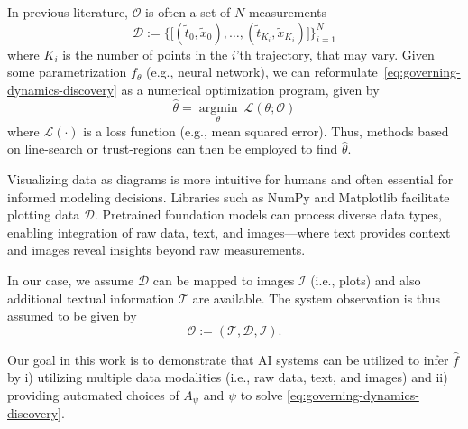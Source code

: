 \documentclass{article}
\begin{document}
In previous literature, $\mathcal{O}$ is often a set of $N$ measurements
\begin{equation}\label{eq:system-observation-raw-measurements}
\mathcal{D} := \Big\{\big[(\widetilde{t}_0, \widetilde{x}_0), \dots, (\widetilde{t}_{K_i}, \widetilde{x}_{K_i})\big]\Big\}_{i=1}^N
\end{equation}
where 
$K_i$ is the number of points in the $i$'th trajectory, that may vary. 
Given some parametrization $f_\theta$ (e.g., neural network), we can reformulate~\eqref{eq:governing-dynamics-discovery} as a numerical optimization program, given by
\begin{equation}
    \label{eq:governing-dynamics-discovery-regression}
    \widehat{\theta} = \underset{\theta}{\text{arg}\min}~\mathcal{L}(\theta; \mathcal{O})
\end{equation}
where $\mathcal{L}(\cdot)$ is a loss function (e.g., mean squared error).
Thus, methods based on line-search or trust-regions can then be employed to find $\widehat{\theta}$.

Visualizing data as diagrams is more intuitive for humans and often essential for informed modeling decisions. 
Libraries such as NumPy and Matplotlib facilitate plotting data $\mathcal{D}$. 
Pretrained foundation models can process diverse data types, enabling integration of raw data, text, and images—where text provides context and images reveal insights beyond raw measurements.


In our case, we assume $\mathcal{D}$ can be mapped to images $\mathcal{I}$ (i.e., plots) and also additional textual information $\mathcal{T}$ are available.
The system observation is thus assumed to be given by 
\begin{equation}\label{eq:system-observation}
    \mathcal{O} := (\mathcal{T}, \mathcal{D}, \mathcal{I}).
\end{equation}

Our goal in this work is to demonstrate that AI systems can be utilized to infer $\widehat{f}$ by 
i) utilizing multiple data modalities (i.e., raw data, text, and images) and
ii) providing automated choices of $A_\psi$ and $\psi$ to solve \eqref{eq:governing-dynamics-discovery}.
\end{document}
